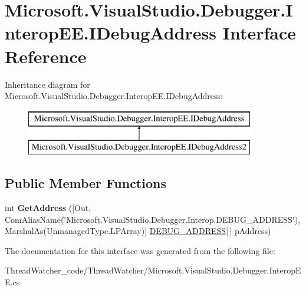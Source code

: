 \hypertarget{interface_microsoft_1_1_visual_studio_1_1_debugger_1_1_interop_e_e_1_1_i_debug_address}{\section{Microsoft.\+Visual\+Studio.\+Debugger.\+Interop\+E\+E.\+I\+Debug\+Address Interface Reference}
\label{interface_microsoft_1_1_visual_studio_1_1_debugger_1_1_interop_e_e_1_1_i_debug_address}
}
Inheritance diagram for Microsoft.\+Visual\+Studio.\+Debugger.\+Interop\+E\+E.\+I\+Debug\+Address\+:\begin{figure}[H]
\begin{center}
\leavevmode
\includegraphics[height=2.000000cm]{interface_microsoft_1_1_visual_studio_1_1_debugger_1_1_interop_e_e_1_1_i_debug_address}
\end{center}
\end{figure}
\subsection*{Public Member Functions}
\begin{DoxyCompactItemize}
\item 
\hypertarget{interface_microsoft_1_1_visual_studio_1_1_debugger_1_1_interop_e_e_1_1_i_debug_address_a51c09c96657dca4e8495610e864d5df5}{int {\bfseries Get\+Address} (\mbox{[}Out, Com\+Alias\+Name(\char`\"{}Microsoft.\+Visual\+Studio.\+Debugger.\+Interop.\+D\+E\+B\+U\+G\+\_\+\+A\+D\+D\+R\+E\+S\+S\char`\"{}), Marshal\+As(Unmanaged\+Type.\+L\+P\+Array)\mbox{]} \hyperlink{struct_microsoft_1_1_visual_studio_1_1_debugger_1_1_interop_e_e_1_1_d_e_b_u_g___a_d_d_r_e_s_s}{D\+E\+B\+U\+G\+\_\+\+A\+D\+D\+R\+E\+S\+S}\mbox{[}$\,$\mbox{]} p\+Address)}\label{interface_microsoft_1_1_visual_studio_1_1_debugger_1_1_interop_e_e_1_1_i_debug_address_a51c09c96657dca4e8495610e864d5df5}

\end{DoxyCompactItemize}


The documentation for this interface was generated from the following file\+:\begin{DoxyCompactItemize}
\item 
Thread\+Watcher\+\_\+code/\+Thread\+Watcher/Microsoft.\+Visual\+Studio.\+Debugger.\+Interop\+E\+E.\+cs\end{DoxyCompactItemize}
